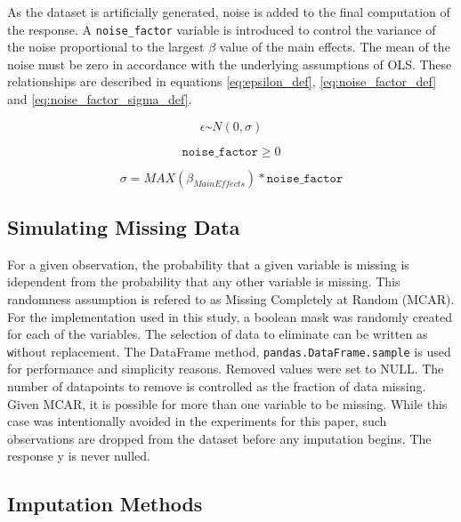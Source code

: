 \documentclass[../../paper.tex]{subfiles}
\begin{document}
As the dataset is artificially generated, noise is added to the final
computation of the response. A \texttt{noise_factor} variable is
introduced to control the variance of the noise proportional
to the largest $\beta$ value of the main effects. The mean of the noise must be
zero in accordance with the underlying assumptions of OLS. These
relationships are described in equations \ref{eq:epsilon_def},
\ref{eq:noise_factor_def} and \ref{eq:noise_factor_sigma_def}.

\begin{equation}\label{eq:epsilon_def}
  \epsilon \text{\textasciitilde} N(0, \sigma)
\end{equation}

\begin{equation}\label{eq:noise_factor_def}
  \texttt{noise_factor} \geq 0
\end{equation}

\begin{equation}\label{eq:noise_factor_sigma_def}
  \sigma = MAX(\beta_{Main Effects}) * \texttt{noise_factor}
\end{equation}


\subsection{Simulating Missing Data}
For a given observation, the probability that a given variable is missing is
idependent from the probability that any other variable is missing. This randomness
assumption is refered to as Missing Completely at Random (MCAR). For the implementation
used in this study, a boolean mask was randomly created for each
of the variables. The selection of data to eliminate can be written as
\texttt without replacement.
The DataFrame method, \texttt{pandas.DataFrame.sample} is used for
performance and simplicity reasons. Removed values were set to NULL. The number of
datapoints to remove is controlled as the fraction of data missing. Given MCAR,
it is possible for more than one variable to be missing. While this case was intentionally avoided in the experiments for this paper, such observations are dropped from the dataset before any imputation begins. The response y is never
nulled.


\subsection{Imputation Methods}
\end{document}
